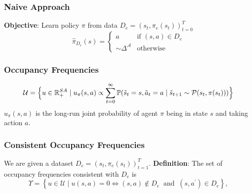 \documentclass{beamer}
\begin{document}
\begin{frame} \frametitle{Naive Approach}
	\textbf{Objective}: Learn policy $\pi$ from data $D_e = {(s_t, \pi_e(s_t))}_{t=0}^{T}$
	\vfill
\[
	\hat{\pi}_{D_e}(s) = 
	\begin{cases}
		a & \text{if } (s,a) \in D_e \\
		\sim \Delta^{\mathcal{A}} & \text{otherwise}
	\end{cases}
\]
\end{frame}

\begin{frame} \frametitle{Occupancy Frequencies}
	\[
		\mathcal{U}
		=
		\Bigl\{ u\in \mathbb{R}^{SA}_{+} \mid u_\pi(s,a) \propto \sum_{t=0}^{\infty} \mathbb{P}(\tilde{s}_t = s, \tilde{a}_t = a \mid \tilde{s}_{t+1} \sim \mathcal{P}(s_t, \pi(s_t))) \Bigr\}
	\]
	\vfill
	$u_\pi(s,a)$ is the long-run joint probability of agent $\pi$ being in state $s$ and taking action $a$.
\end{frame}

\begin{frame} \frametitle{Consistent Occupancy Frequencies}
	We are given a dataset $D_e = {(s_t, \pi_e(s_t))}_{t=1}^T$.
	\vfill
	\textbf{Definition}: The set of occupancy frequencies consistent with $D_e$ is
	\[
		\Upsilon = \left\{ u \in \mathcal{U} \mid u(s,a) = 0 \iff (s,a) \notin D_e \;\; \text{and} \;\; (s,a^\prime) \in D_e \right\},
	\]
\end{frame}


\end{document}
